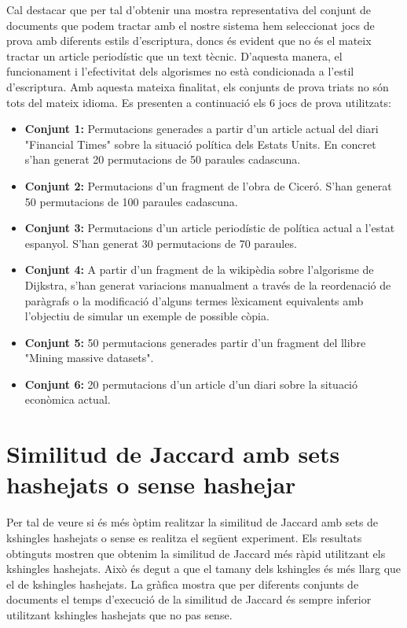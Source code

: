 \documentclass[catalan, 12pt]{report}
\begin{document}
Cal destacar que per tal d'obtenir una mostra representativa del conjunt de documents que podem tractar amb el nostre sistema hem seleccionat jocs de prova amb diferents estils d'escriptura, doncs és evident que no és el mateix tractar un article periodístic que un text tècnic. D'aquesta manera, el funcionament i l'efectivitat dels algorismes no està condicionada a l'estil d'escriptura. Amb aquesta mateixa finalitat, els conjunts de prova triats no són tots del mateix idioma. Es presenten a continuació els 6 jocs de prova utilitzats: \newline

\begin{itemize}
\item \textbf{Conjunt 1:} Permutacions generades a partir d'un article actual del diari "Financial Times" sobre la situació política dels Estats Units. En concret s'han generat 20 permutacions de 50 paraules cadascuna.

\item \textbf{Conjunt 2:} Permutacions d'un fragment de l'obra de Ciceró. S'han generat 50 permutacions de 100 paraules cadascuna.

\item \textbf{Conjunt 3:} Permutacions d'un article periodístic de política actual a l'estat espanyol. S'han generat 30 permutacions de 70 paraules.

\item \textbf{Conjunt 4:} A partir d'un fragment de la wikipèdia sobre l'algorisme de Dijkstra, s'han generat variacions manualment a través de la reordenació de paràgrafs o la modificació d'alguns termes lèxicament equivalents amb l'objectiu de simular un exemple de possible còpia.

\item \textbf{Conjunt 5:} 50 permutacions generades partir d'un fragment del llibre "Mining massive datasets".

\item \textbf{Conjunt 6:} 20 permutacions d'un article d'un diari sobre la situació econòmica actual.
\end{itemize}

\section{Similitud de Jaccard amb sets hashejats o sense hashejar}

Per tal de veure si és més òptim realitzar la similitud de Jaccard amb sets de kshingles hashejats o sense es realitza el següent experiment. Els resultats obtinguts mostren que obtenim la similitud de Jaccard més ràpid utilitzant els kshingles hashejats. Això és degut a que el tamany dels kshingles és més llarg que el de kshingles hashejats. La gràfica mostra que per diferents conjunts de documents el temps d'execució de la similitud de Jaccard és sempre inferior utilitzant kshingles hashejats que no pas sense. 
\end{document}
